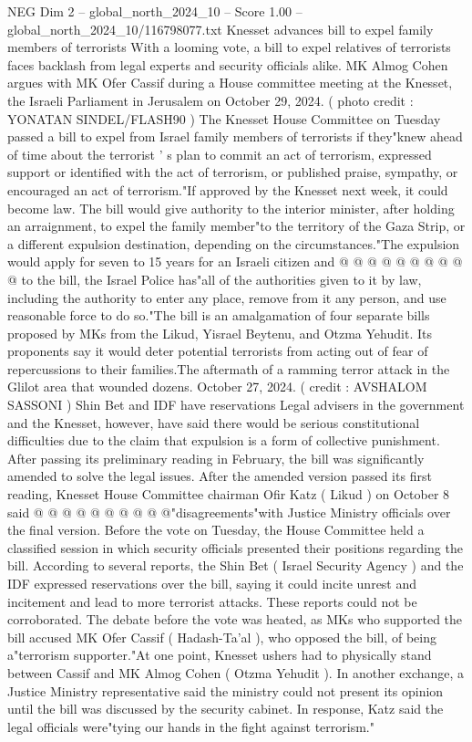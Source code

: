 \begin{textsample}{NEG Dim 2 – global\_north\_2024\_10 – Score 1.00 – global\_north\_2024\_10/116798077.txt}  \label{ex:f2_neg_105}
Knesset advances bill to expel family members of terrorists With a looming vote, a bill to expel relatives of terrorists faces backlash from legal experts and security officials alike.
MK Almog Cohen argues with MK Ofer Cassif during a House committee meeting at the Knesset, the Israeli Parliament in Jerusalem on October 29, 2024. ( photo credit : YONATAN SINDEL/FLASH90 ) The Knesset House Committee on Tuesday passed a bill to expel from Israel family members of terrorists if they"knew ahead of time about the terrorist ' s plan to commit an act of terrorism, expressed support or identified with the act of terrorism, or published praise, sympathy, or encouraged an act of terrorism."If approved by the Knesset next week, it could become law.
The bill would give authority to the interior minister, after holding an arraignment, to expel the family member"to the territory of the Gaza Strip, or a different expulsion destination, depending on the circumstances."The expulsion would apply for seven to 15 years for an Israeli citizen and @ @ @ @ @ @ @ @ @ @ to the bill, the Israel Police has"all of the authorities given to it by law, including the authority to enter any place, remove from it any person, and use reasonable force to do so."The bill is an amalgamation of four separate bills proposed by MKs from the Likud, Yisrael Beytenu, and Otzma Yehudit.
Its proponents say it would deter potential terrorists from acting out of fear of repercussions to their families.The aftermath of a ramming terror attack in the Glilot area that wounded dozens.
October 27, 2024. ( credit : AVSHALOM SASSONI ) Shin Bet and IDF have reservations Legal advisers in the government and the Knesset, however, have said there would be serious constitutional difficulties due to the claim that expulsion is a form of collective punishment.
After passing its preliminary reading in February, the bill was significantly amended to solve the legal issues.
After the amended version passed its first reading, Knesset House Committee chairman Ofir Katz ( Likud ) on October 8 said @ @ @ @ @ @ @ @ @ @"disagreements"with Justice Ministry officials over the final version.
Before the vote on Tuesday, the House Committee held a classified session in which security officials presented their positions regarding the bill.
According to several reports, the Shin Bet ( Israel Security Agency ) and the IDF expressed reservations over the bill, saying it could incite unrest and incitement and lead to more terrorist attacks.
These reports could not be corroborated.
The debate before the vote was heated, as MKs who supported the bill accused MK Ofer Cassif ( Hadash-Ta'al ), who opposed the bill, of being a"terrorism supporter."At one point, Knesset ushers had to physically stand between Cassif and MK Almog Cohen ( Otzma Yehudit ).
In another exchange, a Justice Ministry representative said the ministry could not present its opinion until the bill was discussed by the security cabinet.
In response, Katz said the legal officials were"tying our hands in the fight against terrorism."

\end{textsample}
